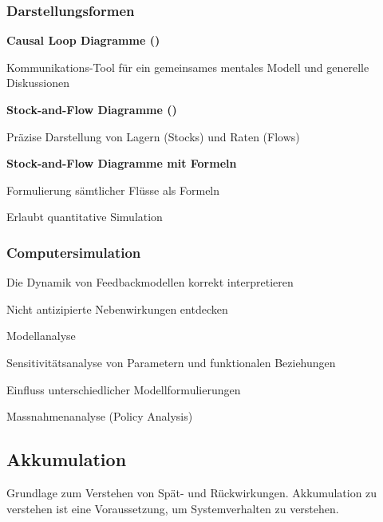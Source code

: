 \subsubsection{Darstellungsformen}
\begin{compactenum}
	\item \textbf{Causal Loop Diagramme ()}
	\begin{compactitem}
		\item Kommunikations-Tool für ein gemeinsames mentales Modell und generelle Diskussionen
	\end{compactitem}
	\item \textbf{Stock-and-Flow Diagramme ()}
	\begin{compactitem}
		\item Präzise Darstellung von Lagern (Stocks) und Raten (Flows)
	\end{compactitem}
	\item \textbf{Stock-and-Flow Diagramme mit Formeln}
	\begin{compactitem}
		\item Formulierung sämtlicher Flüsse als Formeln
		\item Erlaubt quantitative Simulation
	\end{compactitem}
\end{compactenum}

\subsubsection{Computersimulation}
\begin{compactitem}
	\item Die Dynamik von Feedbackmodellen korrekt interpretieren
	\item Nicht antizipierte Nebenwirkungen entdecken
	\item Modellanalyse
	\begin{compactitem}
		\item Sensitivitätsanalyse von Parametern und funktionalen Beziehungen
		\item Einfluss unterschiedlicher Modellformulierungen
		\item Massnahmenanalyse (Policy Analysis)
	\end{compactitem}
\end{compactitem}

\subsection{Akkumulation}
Grundlage zum Verstehen von Spät- und Rückwirkungen. Akkumulation zu verstehen ist eine Voraussetzung, um Systemverhalten zu verstehen.

